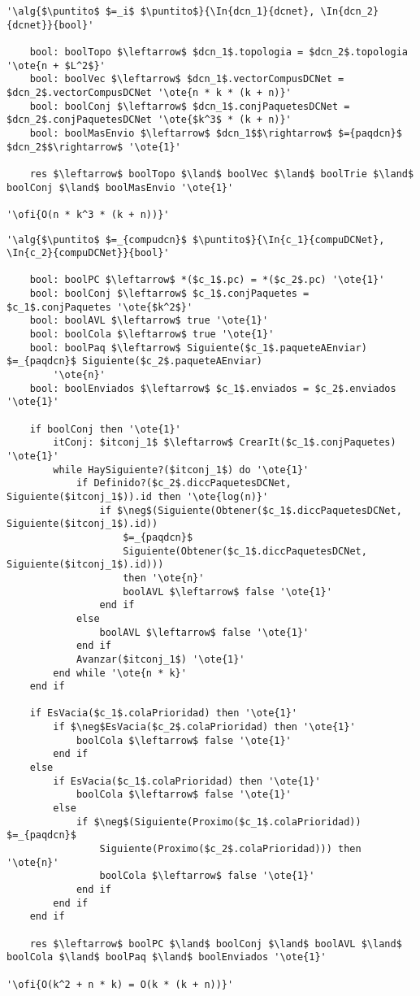 \begin{lstlisting}[mathescape]
'\alg{$\puntito$ $=_i$ $\puntito$}{\In{dcn_1}{dcnet}, \In{dcn_2}{dcnet}}{bool}'
	
	bool: boolTopo $\leftarrow$ $dcn_1$.topologia = $dcn_2$.topologia '\ote{n + $L^2$}'
	bool: boolVec $\leftarrow$ $dcn_1$.vectorCompusDCNet = $dcn_2$.vectorCompusDCNet '\ote{n * k * (k + n)}' 
	bool: boolConj $\leftarrow$ $dcn_1$.conjPaquetesDCNet = $dcn_2$.conjPaquetesDCNet '\ote{$k^3$ * (k + n)}'
	bool: boolMasEnvio $\leftarrow$ $dcn_1$$\rightarrow$ $={paqdcn}$ $dcn_2$$\rightarrow$ '\ote{1}'

	res $\leftarrow$ boolTopo $\land$ boolVec $\land$ boolTrie $\land$ boolConj $\land$ boolMasEnvio '\ote{1}'

'\ofi{O(n * k^3 * (k + n))}'
\end{lstlisting}

\begin{lstlisting}[mathescape]
'\alg{$\puntito$ $=_{compudcn}$ $\puntito$}{\In{c_1}{compuDCNet}, \In{c_2}{compuDCNet}}{bool}'
	
	bool: boolPC $\leftarrow$ *($c_1$.pc) = *($c_2$.pc) '\ote{1}'
	bool: boolConj $\leftarrow$ $c_1$.conjPaquetes = $c_1$.conjPaquetes '\ote{$k^2$}'
	bool: boolAVL $\leftarrow$ true '\ote{1}'
	bool: boolCola $\leftarrow$ true '\ote{1}'
	bool: boolPaq $\leftarrow$ Siguiente($c_1$.paqueteAEnviar) $=_{paqdcn}$ Siguiente($c_2$.paqueteAEnviar) 
		'\ote{n}'
	bool: boolEnviados $\leftarrow$ $c_1$.enviados = $c_2$.enviados '\ote{1}'

	if boolConj then '\ote{1}'
		itConj: $itconj_1$ $\leftarrow$ CrearIt($c_1$.conjPaquetes) '\ote{1}'
		while HaySiguiente?($itconj_1$) do '\ote{1}'
			if Definido?($c_2$.diccPaquetesDCNet, Siguiente($itconj_1$)).id then '\ote{log(n)}'
				if $\neg$(Siguiente(Obtener($c_1$.diccPaquetesDCNet, Siguiente($itconj_1$).id))
					$=_{paqdcn}$ 
					Siguiente(Obtener($c_1$.diccPaquetesDCNet, Siguiente($itconj_1$).id)))
					then '\ote{n}'
					boolAVL $\leftarrow$ false '\ote{1}'
				end if
			else
				boolAVL $\leftarrow$ false '\ote{1}'
			end if
			Avanzar($itconj_1$) '\ote{1}'
		end while '\ote{n * k}'
	end if

	if EsVacia($c_1$.colaPrioridad) then '\ote{1}'
		if $\neg$EsVacia($c_2$.colaPrioridad) then '\ote{1}'
			boolCola $\leftarrow$ false '\ote{1}'
		end if
	else
		if EsVacia($c_1$.colaPrioridad) then '\ote{1}'
			boolCola $\leftarrow$ false '\ote{1}'
		else
			if $\neg$(Siguiente(Proximo($c_1$.colaPrioridad)) $=_{paqdcn}$ 
				Siguiente(Proximo($c_2$.colaPrioridad))) then '\ote{n}'
				boolCola $\leftarrow$ false '\ote{1}'
			end if
		end if
	end if

	res $\leftarrow$ boolPC $\land$ boolConj $\land$ boolAVL $\land$ boolCola $\land$ boolPaq $\land$ boolEnviados '\ote{1}'

'\ofi{O(k^2 + n * k) = O(k * (k + n))}'
\end{lstlisting}

